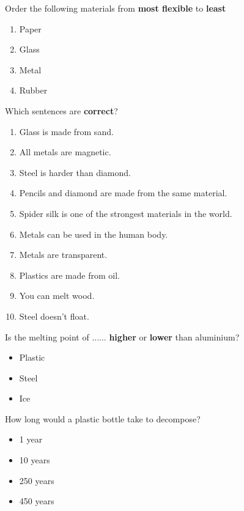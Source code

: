 \documentclass[a4paper, 12pt]{article}
\begin{document}
	\pagestyle{empty}
	\begin{question}
  		Order the following materials from \textbf{most flexible} to \textbf{least}
  		
  		\begin{enumerate}[font=\bfseries]
  		\centering
  			\item Paper
  			\item Glass
  			\item Metal
  			\item Rubber
  		\end{enumerate}
	\end{question}
	\begin{question}
  		Which sentences are \textbf{correct}?
  		
  		\begin{multicols}{2}
  		\begin{enumerate}[font=\bfseries]
  			\item Glass is made from sand.
  			\item All metals are magnetic.
  			\item Steel is harder than diamond.
  			\item Pencils and diamond are made from the same material.
  			\item Spider silk is one of the strongest materials in the world.
  			\item Metals can be used in the human body.
  			\item Metals are transparent.
  			\item Plastics are made from oil.
  			\item You can melt wood.
  			\item Steel doesn’t float.
  		\end{enumerate}
  		\end{multicols}
	\end{question}
	\newpage
	\begin{question}
  		Is the melting point of ...... \textbf{higher} or \textbf{lower} than aluminium?
  		\begin{itemize}
  		\centering
  			\item Plastic
  			\item Steel
  			\item Ice
  		\end{itemize}
	\end{question}
	\begin{question}[Biodegradable?]
  		How long would a plastic bottle take to decompose?
  		\begin{itemize}
  		\centering
  			\item 1 year
  			\item 10 years
  			\item 250 years
  			\item 450 years
  		\end{itemize}
	\end{question}
\end{document}
